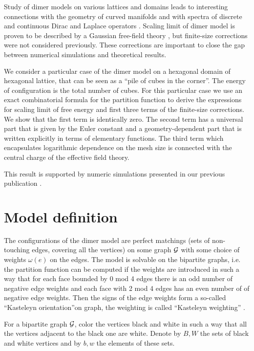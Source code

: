 \documentclass{article}
\begin{document}
Study of dimer models on various lattices and domains leads to interesting connections with the
geometry of curved manifolds and with spectra of discrete and continuous Dirac and Laplace operators
\cite{kenyon2002laplacian,kenyon2000asymptotic}. Scaling limit of dimer model is proven to be
described by a Gaussian free-field theory \cite{kenyon2001dominos}, but finite-size corrections were
not considered previously. These corrections are important to close the gap between numerical
simulations and theoretical results.

We consider a particular case of the dimer model on a hexagonal domain of hexagonal lattice, that
can be seen as a ``pile of cubes in the corner''. The energy of configuration is the total number of
cubes. For this particular case we use an exact combinatorial formula for the partition function to
derive the expressions for scaling limit of free energy and first three terms of the finite-size
corrections. We show that the first term is identically zero. The second term has a universal part
that is given by the Euler constant and a geometry-dependent part that is written explicitly in
terms of elementary functions. The third term which encapsulates logarithmic dependence on the mesh
size is connected with the central charge of the effective field theory. 

This result is supported by numeric simulations presented in our previous publication
\cite{belov2018finite}.

\section{Model definition}
\label{sec:model-definition}
The configurations of the dimer model are perfect matchings (sets of non-touching edges, covering
all the vertices) on some graph ${\cal G}$ with some choice of weights $\omega(e)$ on the edges. The
model is solvable on the bipartite graphs, i.e. the partition function can be computed if the
weights are introduced in such a way that for each face bounded by 0 mod 4 edges there is an odd
number of negative edge weights and each face with 2 mod 4 edges has an even number of of negative
edge weights. Then the signs of the edge weights form a so-called ``Kasteleyn orientation''on graph,
the weighting is called ``Kasteleyn weighting'' \cite{kenyon2001dominos,kenyon2009lectures}.

For a bipartite graph ${\cal G}$, color the vertices black and white in such a way that all the
vertices adjacent to the black one are white. Denote by $B, W$ the sets of black and white
vertices and by $b,w$ the elements of these sets. 
\end{document}
